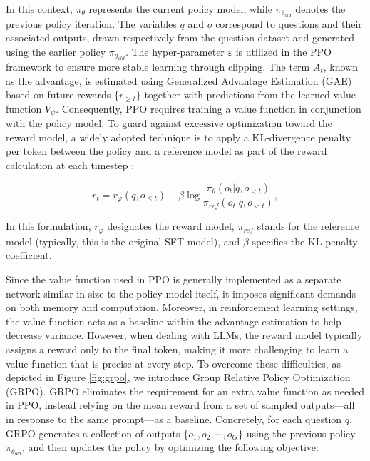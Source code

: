 \begin{itemize}[topsep=0pt]
In this context, $\pi_{\theta}$ represents the current policy model, while $\pi_{\theta_{old}}$ denotes the previous policy iteration. The variables $q$ and $o$ correspond to questions and their associated outputs, drawn respectively from the question dataset and generated using the earlier policy $\pi_{\theta_{old}}$. The hyper-parameter $\varepsilon$ is utilized in the PPO framework to ensure more stable learning through clipping. The term $A_t$, known as the advantage, is estimated using Generalized Advantage Estimation (GAE) \citep{gae} based on future rewards $\{r_{\ge t}\}$ together with predictions from the learned value function $V_{\psi}$. Consequently, PPO requires training a value function in conjunction with the policy model. To guard against excessive optimization toward the reward model, a widely adopted technique is to apply a KL-divergence penalty per token between the policy and a reference model as part of the reward calculation at each timestep \citep{ouyang2022training}:

\begin{equation}
    r_{t} = r_\varphi(q, o_{\le t}) - \beta \log\frac{\pi_{\theta}(o_{t}|q, o_{<t})}{\pi_{ref}(o_{t}|q, o_{<t})},
\label{eq:PPO-reward}
\end{equation}

In this formulation, $r_\varphi$ designates the reward model, $\pi_{ref}$ stands for the reference model (typically, this is the original SFT model), and $\beta$ specifies the KL penalty coefficient.

Since the value function used in PPO is generally implemented as a separate network similar in size to the policy model itself, it imposes significant demands on both memory and computation. Moreover, in reinforcement learning settings, the value function acts as a baseline within the advantage estimation to help decrease variance. However, when dealing with LLMs, the reward model typically assigns a reward only to the final token, making it more challenging to learn a value function that is precise at every step. To overcome these difficulties, as depicted in Figure \ref{fig:grpo}, we introduce Group Relative Policy Optimization (GRPO). GRPO eliminates the requirement for an extra value function as needed in PPO, instead relying on the mean reward from a set of sampled outputs—all in response to the same prompt—as a baseline. Concretely, for each question $q$, GRPO generates a collection of outputs $\{o_1, o_2, \cdots, o_G\}$ using the previous policy $\pi_{\theta_{old}}$, and then updates the policy by optimizing the following objective:


\end{itemize}
